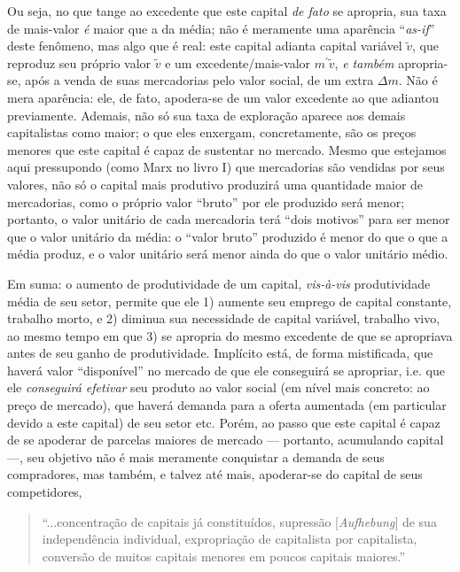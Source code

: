 \documentclass[12pt]{article}
\numberwithin{equation}{section}
\theoremstyle{plain}
\theoremstyle{definition}
\theoremstyle{remark}
\begin{document}
Ou seja, no que tange ao excedente que este capital \textit{de fato} se apropria, sua taxa de mais-valor \textit{é} maior que a da média; não é meramente uma aparência ``\textit{as-if}'' deste fenômeno, mas algo que é real: este capital adianta capital variável $\tilde{v}$, que reproduz seu próprio valor $\tilde{v}$ e um excedente/mais-valor $m^{\prime}\tilde{v}$, \textit{e também} apropria-se, após a venda de suas mercadorias pelo valor social, de um extra $\Delta m$. Não é mera aparência: ele, de fato, apodera-se de um valor excedente ao que adiantou previamente. Ademais, não só sua taxa de exploração aparece aos demais capitalistas como maior; o que eles enxergam, concretamente, são os preços menores que este capital é capaz de sustentar no mercado. Mesmo que estejamos aqui pressupondo (como Marx no livro I) que mercadorias são vendidas por seus valores, não só o capital mais produtivo produzirá uma quantidade maior de mercadorias, como o próprio valor ``bruto'' por ele produzido será menor; portanto, o valor unitário de cada mercadoria terá ``dois motivos'' para ser menor que o valor unitário da média: o ``valor bruto'' produzido é menor do que o que a média produz, e o valor unitário será menor ainda do que o valor unitário médio.

Em suma: o aumento de produtividade de um capital, \textit{vis-à-vis} produtividade média de seu setor, permite que ele 1) aumente seu emprego de capital constante, trabalho morto, e 2) diminua sua necessidade de capital variável, trabalho vivo, ao mesmo tempo em que 3) se apropria do mesmo excedente de que se apropriava antes de seu ganho de produtividade. Implícito está, de forma mistificada, que haverá valor ``disponível'' no mercado de que ele conseguirá se apropriar, i.e. que ele \textit{conseguirá efetivar} seu produto ao valor social (em nível mais concreto: ao preço de mercado), que haverá demanda para a oferta aumentada (em particular devido a este capital) de seu setor etc. Porém, ao passo que este capital é capaz de se apoderar de parcelas maiores de mercado — portanto, acumulando capital —, seu objetivo não é mais meramente conquistar a demanda de seus compradores, mas também, e talvez até mais, apoderar-se do capital de seus competidores,
\begin{quote}
``...concentração de capitais já constituídos, supressão [\textit{Aufhebung}] de sua independência individual, expropriação de capitalista por capitalista, conversão de muitos capitais menores em poucos capitais maiores.'' \parencite[p. 701]{Marx2017}
\end{quote}
\end{document}

